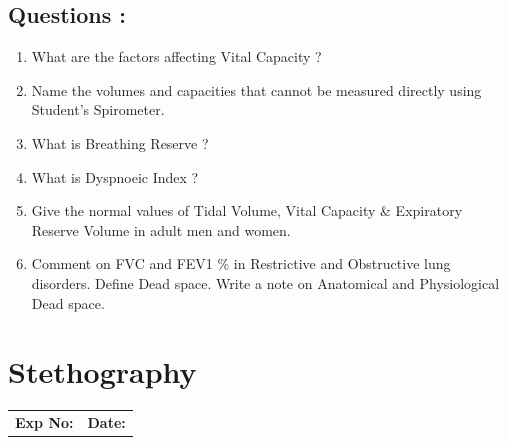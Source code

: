 \documentclass[a4paper,12pt,openany,oneside]{book}
\begin{document}
														\section*{Questions :}
														\begin{enumerate}
\item{														 What are the factors affecting Vital Capacity ?}
\item{														 Name the volumes and capacities that cannot be measured directly using Student’s Spirometer.}
\item{														 What is Breathing Reserve ?}
\item{														 What is Dyspnoeic Index ?}
\item{														 Give the normal values of Tidal Volume, Vital Capacity \& Expiratory Reserve Volume in adult men and women.}
\item{														 Comment on FVC and FEV1 \% in Restrictive and Obstructive lung disorders.}
														 Define Dead space. Write a note on Anatomical and Physiological Dead space.

														\end{enumerate}
															\chapter*{\centering Stethography}
															\begin{tabular}{p{5in} p{1in}}
																\textbf{Exp No:}  & \textbf{Date:}\\
															\end{tabular}
\end{document}
